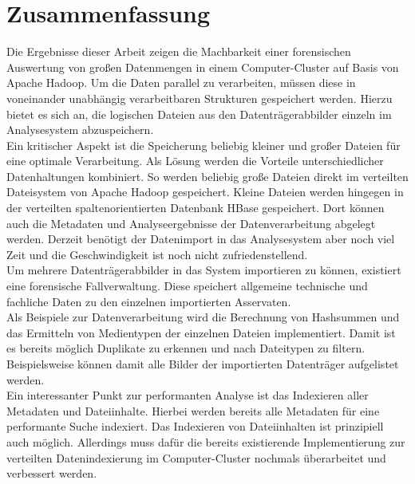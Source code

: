 \chapter{Zusammenfassung}
\label{ch:zusammenfassung}

Die Ergebnisse dieser Arbeit zeigen die Machbarkeit einer forensischen Auswertung von großen Datenmengen in einem Computer-Cluster auf Basis von Apache Hadoop. Um die Daten parallel zu verarbeiten, müssen diese in voneinander unabhängig verarbeitbaren Strukturen gespeichert werden. Hierzu bietet es sich an, die logischen Dateien aus den Datenträgerabbilder einzeln im Analysesystem abzuspeichern.\\
Ein kritischer Aspekt ist die Speicherung beliebig kleiner und großer Dateien für eine optimale Verarbeitung. Als Lösung werden die Vorteile unterschiedlicher Datenhaltungen kombiniert. So werden beliebig große Dateien direkt im verteilten Dateisystem von Apache Hadoop gespeichert. Kleine Dateien werden hingegen in der verteilten spaltenorientierten Datenbank HBase gespeichert. Dort können auch die Metadaten und Analyseergebnisse der Datenverarbeitung abgelegt werden. Derzeit benötigt der Datenimport in das Analysesystem aber noch viel Zeit und die Geschwindigkeit ist noch nicht zufriedenstellend.\\
Um mehrere Datenträgerabbilder in das System importieren zu können, existiert eine forensische Fallverwaltung. Diese speichert allgemeine technische und fachliche Daten zu den einzelnen importierten Asservaten.\\

\noindent
Als Beispiele zur Datenverarbeitung wird die Berechnung von Hashsummen und das Ermitteln von Medientypen der einzelnen Dateien implementiert. Damit ist es bereits möglich Duplikate zu erkennen und nach Dateitypen zu filtern. Beispielsweise können damit alle Bilder der importierten Datenträger aufgelistet werden.\\
Ein interessanter Punkt zur performanten Analyse ist das Indexieren aller Metadaten und Dateiinhalte. Hierbei werden bereits alle Metadaten für eine performante Suche indexiert. Das Indexieren von Dateiinhalten ist prinzipiell auch möglich. Allerdings  muss dafür die bereits existierende Implementierung zur verteilten Datenindexierung im Computer-Cluster nochmals überarbeitet und verbessert werden.\\


